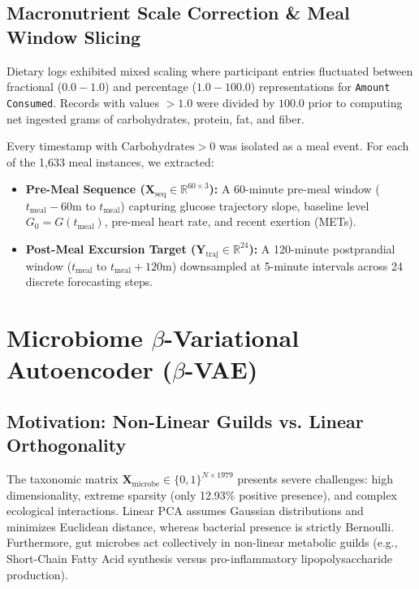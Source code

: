 \documentclass[conference]{IEEEtran}
\begin{document}
\subsection{Macronutrient Scale Correction \& Meal Window Slicing}
Dietary logs exhibited mixed scaling where participant entries fluctuated between fractional ($0.0 - 1.0$) and percentage ($1.0 - 100.0$) representations for \texttt{Amount Consumed}. Records with values $>1.0$ were divided by $100.0$ prior to computing net ingested grams of carbohydrates, protein, fat, and fiber.

Every timestamp with $\text{Carbohydrates} > 0$ was isolated as a meal event. For each of the 1,633 meal instances, we extracted:
\begin{itemize}
    \item \textbf{Pre-Meal Sequence ($\mathbf{X}_{\text{seq}} \in \mathbb{R}^{60 \times 3}$):} A 60-minute pre-meal window ($t_{\text{meal}}-60\text{m}$ to $t_{\text{meal}}$) capturing glucose trajectory slope, baseline level $G_0 = G(t_{\text{meal}})$, pre-meal heart rate, and recent exertion (METs).
    \item \textbf{Post-Meal Excursion Target ($\mathbf{Y}_{\text{traj}} \in \mathbb{R}^{24}$):} A 120-minute postprandial window ($t_{\text{meal}}$ to $t_{\text{meal}}+120\text{m}$) downsampled at 5-minute intervals across 24 discrete forecasting steps.
\end{itemize}

\section{Microbiome $\beta$-Variational Autoencoder ($\beta$-VAE)}

\subsection{Motivation: Non-Linear Guilds vs. Linear Orthogonality}
The taxonomic matrix $\mathbf{X}_{\text{microbe}} \in \{0, 1\}^{N \times 1979}$ presents severe challenges: high dimensionality, extreme sparsity (only 12.93\% positive presence), and complex ecological interactions. Linear PCA assumes Gaussian distributions and minimizes Euclidean distance, whereas bacterial presence is strictly Bernoulli. Furthermore, gut microbes act collectively in non-linear metabolic guilds (e.g., Short-Chain Fatty Acid synthesis versus pro-inflammatory lipopolysaccharide production).
\end{document}
